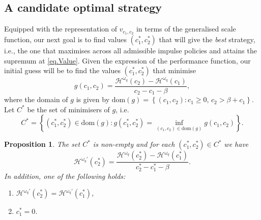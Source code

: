 \documentclass[10pt,a4paper]{amsart}
\newtheorem{proposition}{Proposition}[section]
\newcommand{\cH}{\mathcal{H}}
\newcommand{\homega}{\omega_q}
\newcommand{\BRA}[1]{{{\left\{#1\right\}}}} %
\renewcommand{\geq}{\geqslant}
\begin{document}
\subsection{A candidate optimal strategy}
Equipped with the representation of $v_{c_1,c_2}$ in terms of the generalised scale function, our next goal is to find values $(c^\ast_1,c^\ast_2)$ that will give the \textit{best} strategy, i.e., the one that maximises across all admissible impulse policies and attains the supremum at \eqref{eq.Value}. Given the expression of the performance function, our initial guess will be to find the values $(c^\ast_1,c^\ast_2)$ that minimise
\[
g(c_1,c_2) = \frac{\cH^{\homega}(c_2) - \cH^{\homega}(c_1)}{c_2-c_1-\beta},
\]
where the domain of $g$ is given by $\text{dom}(g) = \BRA{(c_1,c_2): c_1 \geq 0, \, c_2 > \beta + c_1}$.\\
Let $C^\ast$ be the set of minimisers of $g$, i.e.
\[
C^\ast = \BRA{(c_1^\ast, c_2^\ast) \in \text{dom}(g): g(c_1^\ast, c_2^\ast) = \inf_{(c_1,c_2)\in \text{dom}(g)}g(c_1,c_2)}.
\]
\begin{proposition}
	The set $C^\ast$ is non-empty and for each $(c_1^\ast, c_2^\ast) \in C^\ast$ we have
	\[
	\cH^{\homega\prime}(c_2^\ast) = \frac{\cH^{\homega}(c_2^\ast) - \cH^{\homega}(c_1^\ast)}{c_2^\ast-c_1^\ast-\beta}.
	\]
	In addition, one of the following holds:
	\begin{enumerate}
		\item $\cH^{\homega\prime}(c_2^\ast) = \cH^{\homega\prime}(c_1^\ast)$,
		\item $c_1^\ast = 0$.
	\end{enumerate}
\end{proposition}
\end{document}
